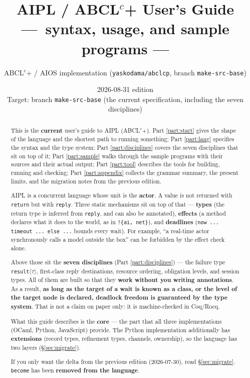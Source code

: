 \documentclass[11pt,a4paper]{article}
\title{AIPL / ABCL$^{c}$+ User's Guide\\
{\large ---\ syntax, usage, and sample programs ---}}
\author{ABCL$^{c}$+ / AIOS implementation (\texttt{yaskodama/abclcp}, branch \texttt{make-src-base})}
\date{2026-08-31 edition\\{\small Target: branch \texttt{make-src-base} (the current specification, including the seven disciplines)}}
\begin{document}
\maketitle

\begin{abstract}
This is the \textbf{current} user's guide to AIPL (ABCL$^{c}$+).
Part \ref{part:start} gives the shape of the language and the shortest path to
running something; Part \ref{part:lang} specifies the syntax and the type
system; Part \ref{part:disciplines} covers the seven disciplines that sit on
top of it; Part \ref{part:sample} walks through the sample programs with their
sources and their actual output; Part \ref{part:tool} describes the tools for
building, running and checking; Part \ref{part:appendix} collects the grammar
summary, the present limits, and the migration notes from the previous edition.

AIPL is a concurrent language whose unit is the \textbf{actor}. A value is not
returned with \texttt{return} but with \texttt{reply}. Three static mechanisms
sit on top of that --- \textbf{types} (the return type is inferred from
\texttt{reply}, and can also be annotated), \textbf{effects} (a method declares
what it does to the world, as in \texttt{!\{ai, net\}}), and \textbf{deadlines}
(\texttt{now ... timeout ... else ...} bounds every wait). For example, ``a
real-time actor synchronously calls a model outside the box'' can be forbidden
by the effect check alone.

Above those sit the \textbf{seven disciplines} (Part \ref{part:disciplines}) ---
the failure type \texttt{result}$\langle\tau\rangle$, first-class reply
destinations, resource ordering, obligation levels, and session types. All of
them are built so that they \textbf{work without you writing annotations}.
As a result, \textbf{as long as the target of a wait is known as a class, or
the level of the target node is declared, deadlock freedom is guaranteed by the
type system}. That is not a claim on paper only: it is machine-checked in
Coq/Rocq.

What this guide describes is the \textbf{core} --- the part that all three
implementations (OCaml, Python, JavaScript) provide. The Python implementation
additionally has \textbf{extensions} (record types, refinement types, channels,
ownership), so the language has two layers (\S\ref{sec:migrate}).

If you only want the delta from the previous edition (2026-07-30), read
\S\ref{sec:migrate}. \texttt{become} has been \textbf{removed from the language}.
\end{abstract}
\end{document}

